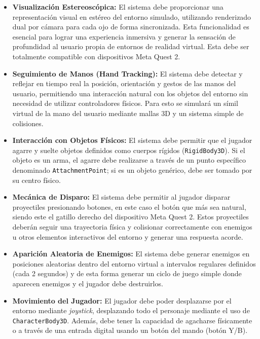\documentclass[journal,article,accept,pdftex,moreauthors]{Definitions/mdpi}
\begin{document}
\begin{itemize}
  \item \textbf{Visualización Estereoscópica:} El sistema debe proporcionar una representación visual en estéreo del entorno simulado, utilizando renderizado dual por cámara para cada ojo de forma sincronizada. Esta funcionalidad es esencial para lograr una experiencia inmersiva y generar la sensación de profundidad al usuario propia de entornos de realidad virtual. Esta debe ser totalmente compatible con dispositivos Meta Quest 2.

  \item \textbf{Seguimiento de Manos (Hand Tracking):} El sistema debe detectar y reflejar en tiempo real la posición, orientación y gestos de las manos del usuario, permitiendo una interacción natural con los objetos del entorno sin necesidad de utilizar controladores físicos. Para esto se simulará un símil virtual de la mano del usuario mediante mallas 3D y un sistema simple de colisiones.

  \item \textbf{Interacción con Objetos Físicos:} El sistema debe permitir que el jugador agarre y suelte objetos definidos como cuerpos rígidos (\texttt{RigidBody3D}). Si el objeto es un arma, el agarre debe realizarse a través de un punto específico denominado \texttt{AttachmentPoint}; si es un objeto genérico, debe ser tomado por su centro físico.

  \item \textbf{Mecánica de Disparo:} El sistema debe permitir al jugador disparar proyectiles presionando botones, en este caso el botón que más sea natural, siendo este el gatillo derecho del dispositivo Meta Quest 2. Estos proyectiles deberán seguir una trayectoria física y colisionar correctamente con enemigos u otros elementos interactivos del entorno y generar una respuesta acorde.

  \item \textbf{Aparición Aleatoria de Enemigos:} El sistema debe generar enemigos en posiciones aleatorias dentro del entorno virtual a intervalos regulares definidos (cada 2 segundos) y de esta forma generar un ciclo de juego simple donde aparecen enemigos y el jugador debe destruirlos.

  \item \textbf{Movimiento del Jugador:} El jugador debe poder desplazarse por el entorno mediante \textit{joystick}, desplazando todo el personaje mediante el uso de \texttt{CharacterBody3D}. Además, debe tener la capacidad de agacharse físicamente o a través de una entrada digital usando un botón del mando (botón Y/B).


\end{itemize}
\end{document}
